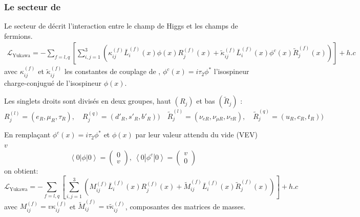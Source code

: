 \subsubsection{Le secteur de }
Le secteur de  décrit l'interaction entre le champ de Higgs et les champs de fermions.
\begin{equation}
\begin{split}
\mathcal{L}_{\mathrm{Yukawa}}=-\sum_{f=l,q}\left[\sum_{i,j=1}^{3}\left(\kappa_{ij}^{(f)}\bar{L}_{i}^{(f)}(x)\phi(x)R_{j}^{(f)}(x)+\tilde{\kappa}_{ij}^{(f)}\bar{L}_{i}^{(f)}(x)\phi^{c}(x)\tilde{R}_{j}^{(f)}(x)\right)\right]+ h.c
\end{split}
\end{equation} 
avec $\kappa_{ij}^{(f)}$ et $\tilde{\kappa}_{ij}^{(f)}$ les constantes de couplage de , $\phi^{c}(x)=i\tau_{2}\phi^{*}$ l'isospineur charge-conjugué de l'isospineur $\phi(x)$.

Les singlets droits sont divisés en deux groupes, haut $\left(R_{j}\right)$ et bas $\left(\tilde{R}_{j}\right)$ :
\begin{equation}
R_j^{(l)}=\left(e_{R},\mu_{R},\tau_{R}\right),\quad R_j^{(q)}=\left(d'_{R},s'_{R},b'_{R}\right)) \quad \tilde{R}_j^{(l)}=\left(\nu_{eR},\nu_{\mu R},\nu_{\tau R}\right),\quad \tilde{R}_j^{(q)}=\left(u_{R},c_{R},t_{R}\right))
\end{equation} 

En remplaçant $\phi^{c}(x)=i\tau_{2}\phi^{*}$ et $\phi(x)$ par leur valeur attendu du vide (VEV) $v$
\begin{equation}
\left<0\left|\phi \right|0\right>=\begin{pmatrix} 0\\v\end{pmatrix},\ \left<0\left|\phi^{c} \right|0\right>=\begin{pmatrix} v\\ 0\end{pmatrix}
\end{equation} on obtient:
\begin{equation}
\mathcal{L}_{\mathrm{Yukawa}}=-\sum_{f=l,q}\left[\sum_{i,j=1}^{3}\left(M^{(f)}_{ij}\bar{L}_{i}^{(f)}(x)R_{j}^{(f)}(x)+\tilde{M}^{(f)}_{ij}\bar{L}_{i}^{(f)}(x)\tilde{R}_{j}^{(f)}(x)\right)\right]+ h.c
\end{equation} 
avec $M^{(f)}_{ij}=v\kappa_{ij}^{(f)}$ et $\tilde{M}^{(f)}_{ij}=v\tilde{\kappa}_{ij}^{(f)}$, composantes des matrices de masses.

